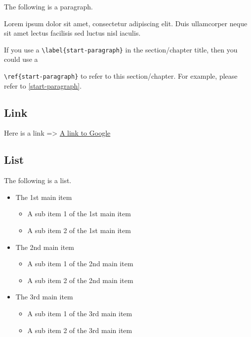 \documentclass[10pt, a4paper, oneside]{article}
\providecommand{\tightlist}{%
  \setlength{\itemsep}{0pt}\setlength{\parskip}{0pt}}
\begin{document}
The following is a paragraph.

Lorem ipsum dolor sit amet, consectetur adipiscing elit.
Duis ullamcorper neque sit amet lectus facilisis sed luctus nisl iaculis.

If you use a \texttt{\textbackslash{}label\{start-paragraph\}} in the section/chapter title, then you could use a

\texttt{\textbackslash{}ref\{start-paragraph\}} to refer to this section/chapter.
For example, please refer to \ref{start-paragraph}.

\subsection{Link}\label{link}

Here is a link =\textgreater{} \href{https://www.google.com}{A link to Google}

\subsection{List}\label{list}

The following is a list.

\begin{itemize}
\tightlist
\item
  The 1st main item

  \begin{itemize}
  \tightlist
  \item
    A sub item 1 of the 1st main item
  \item
    A sub item 2 of the 1st main item
  \end{itemize}
\item
  The 2nd main item

  \begin{itemize}
  \tightlist
  \item
    A sub item 1 of the 2nd main item
  \item
    A sub item 2 of the 2nd main item
  \end{itemize}
\item
  The 3rd main item

  \begin{itemize}
  \tightlist
  \item
    A sub item 1 of the 3rd main item
  \item
    A sub item 2 of the 3rd main item
  \end{itemize}
\end{itemize}
\end{document}
